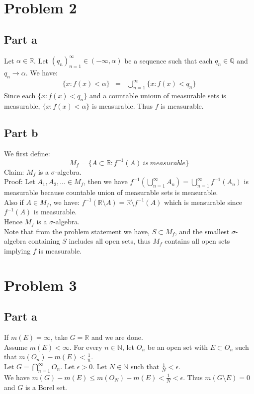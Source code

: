 \documentclass[12pt]{article}
\begin{document}
\clearpage
\section*{Problem 2}
\subsection*{Part a}
Let $\alpha \in \mathbb{R}$.
Let $(q_n)_{n=1}^{\infty} \in (-\infty,\alpha)$ be a sequence such that each $q_n \in \mathbb{Q}$ and $q_n \rightarrow \alpha$.
We have:
\begin{eqnarray*}
\{x:f(x) < \alpha\} &=&
\bigcup_{n=1}^{\infty} \{x:f(x)<q_n\}
\end{eqnarray*}  
Since each $\{x:f(x)<q_n\}$ and a countable unioun of measurable sets is measurable, $\{x:f(x) < \alpha\}$ is measurable. Thus $f$ is measurable. 
\subsection*{Part b}
We first define:
$$M_f=\{A \subset \mathbb{R}: f^{-1}(A) \ is \ measurable\}$$
Claim: $M_f$ is a $\sigma$-algebra. \\
Proof: Let $A_1,A_2,... \in M_f$, then we have
$f^{-1}(\bigcup_{n=1}^{\infty} A_n)=
\bigcup_{n=1}^{\infty} f^{-1}(A_n)$ is measurable because countable union of measurable sets is measurable.
\\
Also if $A \in M_f$, we have:
$f^{-1}(\mathbb{R}\setminus A)=\mathbb{R}\setminus f^{-1}(A)$ which is measurable since $f^{-1}(A)$ is measurable. \\
Hence $M_f$ is a $\sigma$-algebra. \\
Note that from the problem statement we have, $S \subset M_f$, and the smallest $\sigma$-algebra containing $S$ includes all open sets, thus $M_f$ contains all open sets implying $f$ is measurable.

\clearpage
\section*{Problem 3}
\subsection*{Part a}
If $m(E)=\infty$, take $G=\mathbb{R}$ and we are done. \\
Assume $m(E) < \infty$. For every $n \in \mathbb{N}$, let $O_n$ be an open set with $E \subset O_n$ such that $m(O_n)-m(E) < \frac{1}{n}$. \\
Let $G= \bigcap_{n=1}^{\infty} O_n$. Let $\epsilon >0$. Let $N \in \mathbb{N}$ such that $\frac{1}{N} < \epsilon$. \\
We have
$m(G)-m(E) \le m(O_N)-m(E) < \frac{1}{N} < \epsilon$.
Thus $m(G\setminus E)=0$ and $G$ is a Borel set.
\end{document}
